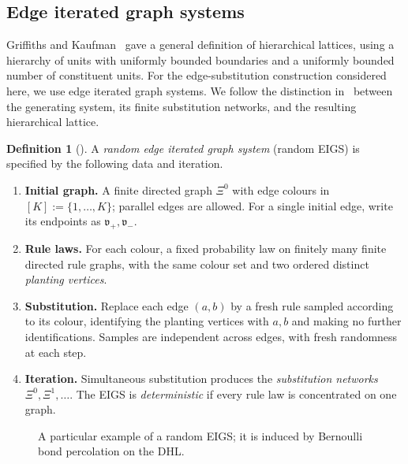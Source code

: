 \documentclass[scheme=plain,11pt]{ctexart}
\theoremstyle{definition}
\newtheorem{definition}[theorem]{Definition}
\theoremstyle{remark}
\begin{document}
\subsection{Edge iterated graph systems}
Griffiths and Kaufman~\cite{griffiths1982spin} gave a general definition of hierarchical lattices, using a hierarchy of units with uniformly bounded boundaries and a uniformly bounded number of constituent units.
For the edge-substitution construction considered here, we use edge iterated graph systems.
We follow the distinction in~\cite{neroli2026iterated} between the generating system, its finite substitution networks, and the resulting hierarchical lattice.

\begin{samepage}
\begin{definition}[\cite{neroli2024fractal}]\label{definition:EIGS}
A \emph{random edge iterated graph system} (random EIGS) is specified by the following data and iteration.
{\small
\begin{enumerate}[label=\arabic*.,leftmargin=*,topsep=3pt,itemsep=1pt,parsep=0pt]
\item \textbf{Initial graph.} A finite directed graph $\Xi^0$ with edge colours in $[K]:=\{1,\ldots,K\}$; parallel edges are allowed. For a single initial edge, write its endpoints as $\mathfrak v_+,\mathfrak v_-$.
\item \textbf{Rule laws.} For each colour, a fixed probability law on finitely many finite directed rule graphs, with the same colour set and two ordered distinct \emph{planting vertices}.
\item \textbf{Substitution.} Replace each edge $(a,b)$ by a fresh rule sampled according to its colour, identifying the planting vertices with $a,b$ and making no further identifications. Samples are independent across edges, with fresh randomness at each step.
\item \textbf{Iteration.} Simultaneous substitution produces the \emph{substitution networks} $\Xi^0,\Xi^1,\ldots$. The EIGS is \emph{deterministic} if every rule law is concentrated on one graph.
\end{enumerate}}
\end{definition}
\end{samepage}

\begin{figure}[tbp]
\centering
\resizebox{\linewidth}{!}{}
\caption{A particular example of a random EIGS; it is induced by Bernoulli bond percolation on the DHL.}
\label{fig:random-eigs-dhl}
\end{figure}
\end{document}
